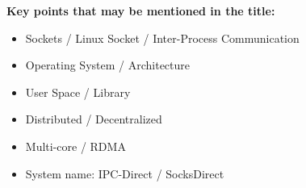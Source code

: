 \textbf{Key points that may be mentioned in the title:}

\begin{itemize}
	\item Sockets / Linux Socket / Inter-Process Communication
	\item Operating System / Architecture
	\item User Space / Library
	\item Distributed / Decentralized
	\item Multi-core / RDMA
	\item System name: IPC-Direct / SocksDirect
\end{itemize}
\fi